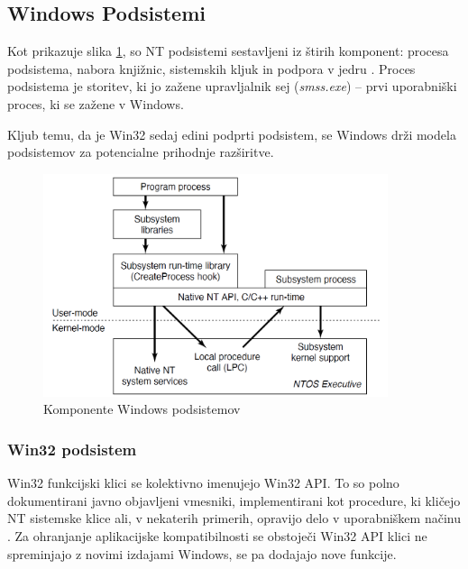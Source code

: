 \documentclass[a4paper,12pt,openright]{book}
\begin{document}
\subsection{Windows Podsistemi}

Kot prikazuje slika \ref{fig:windows_subsystems_components}, so NT podsistemi sestavljeni iz štirih komponent: procesa podsistema, nabora knjižnic, sistemskih kljuk in podpora v jedru \cite{Tanenbaum_Bos_2023}.
Proces podsistema je storitev, ki jo zažene upravljalnik sej (\textit{smss.exe}) -- prvi uporabniški proces, ki se zažene v Windows.

Kljub temu, da je Win32 sedaj edini podprti podsistem, se Windows drži modela podsistemov za potencialne prihodnje razširitve.

\begin{figure}[h!]
	\begin{center}
		\includegraphics[width=0.9\textwidth]{images/windows_subsystems_components.png}
	\end{center}
	\caption{Komponente Windows podsistemov \cite{Tanenbaum_Bos_2023}}
	\label{fig:windows_subsystems_components}
\end{figure}

\subsubsection{Win32 podsistem}

Win32 funkcijski klici se kolektivno imenujejo Win32 API.
To so polno dokumentirani javno objavljeni vmesniki, implementirani kot procedure, ki kličejo NT sistemske klice ali, v nekaterih primerih, opravijo delo v uporabniškem načinu \cite{Tanenbaum_Bos_2023}.
Za ohranjanje aplikacijske kompatibilnosti se obstoječi Win32 API klici ne spreminjajo z novimi izdajami Windows, se pa dodajajo nove funkcije.
\end{document}
